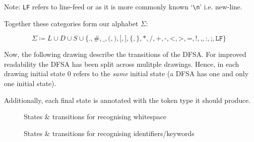 Note: \texttt{LF} refers to line-feed or as it is
more commonly known `\texttt{\textbackslash n}'
i.e. new-line.

Together these categories form our alphabet
$\Sigma$:

$$\Sigma \coloneq L \cup D \cup S \cup
\{\texttt{.},\texttt{\#},\texttt{\_},\texttt{(},\texttt{)},\texttt{[},\texttt{]},\texttt{\{},\texttt{\}},\texttt{*},\texttt{/},\texttt{+},\texttt{-},\texttt{<},\texttt{>},\texttt{=},\texttt{!},\texttt{,},\texttt{:},\texttt{;},\texttt{LF}\}$$

Now, the following drawing describe the
transitions of the DFSA. For improved readability
the DFSA has been split across mulitple drawings.
Hence, in each drawing  initial state $0$ refers
to the \emph{same} initial state (a DFSA has one
and only one initial state).

Additionally, each final state is annotated with
the token type it should produce.


\begin{figure}[H]
\centering
{}
\caption{States \& transitions for recognising
whitespace}
\end{figure}

\begin{figure}[H]
\centering
{}
\caption{States \& transitions for recognising
identifiers/keywords}
\end{figure}


